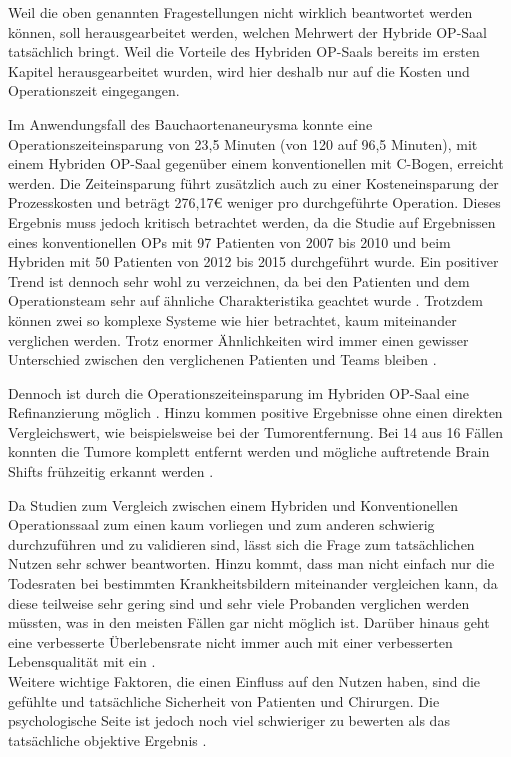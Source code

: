 Weil die oben genannten Fragestellungen nicht wirklich beantwortet werden können, soll herausgearbeitet werden, welchen Mehrwert der Hybride OP-Saal tatsächlich bringt. Weil die Vorteile des Hybriden OP-Saals bereits im ersten Kapitel herausgearbeitet wurden, wird hier deshalb nur auf die Kosten und Operationszeit eingegangen.

Im Anwendungsfall des Bauchaortenaneurysma konnte eine Operationszeiteinsparung von 23,5 Minuten (von 120 auf 96,5 Minuten), mit einem Hybriden OP-Saal gegenüber einem konventionellen mit C-Bogen, erreicht werden. Die Zeiteinsparung führt zusätzlich auch zu einer Kosteneinsparung der Prozesskosten und beträgt 276,17€ weniger pro durchgeführte Operation.
Dieses Ergebnis muss jedoch kritisch betrachtet werden, da die Studie auf Ergebnissen eines konventionellen OPs mit 97 Patienten von 2007 bis 2010 und beim Hybriden mit 50 Patienten von 2012 bis 2015 durchgeführt wurde. Ein positiver Trend ist dennoch sehr wohl zu verzeichnen, da bei den Patienten und dem Operationsteam sehr auf  ähnliche Charakteristika geachtet wurde \cite{HybriderVsKonventioneller}.
Trotzdem können zwei so komplexe Systeme wie hier betrachtet, kaum miteinander verglichen werden. Trotz enormer Ähnlichkeiten wird immer einen gewisser Unterschied zwischen den verglichenen Patienten und Teams bleiben \cite{DerDigitaleOperationssaal}.

Dennoch ist durch die Operationszeiteinsparung im Hybriden OP-Saal eine Refinanzierung möglich \cite{HybriderVsKonventioneller}. Hinzu kommen positive Ergebnisse ohne einen direkten Vergleichswert, wie beispielsweise bei der Tumorentfernung. Bei 14 aus 16 Fällen konnten die Tumore komplett entfernt werden und mögliche auftretende Brain Shifts frühzeitig erkannt werden \cite{BrainShiftInTumorResection}.

Da Studien zum Vergleich zwischen einem Hybriden und Konventionellen Operationssaal zum einen kaum vorliegen und zum anderen schwierig durchzuführen und zu validieren sind, lässt sich die Frage zum tatsächlichen Nutzen sehr schwer beantworten. Hinzu kommt, dass man nicht einfach nur die Todesraten bei bestimmten Krankheitsbildern miteinander vergleichen kann, da diese teilweise sehr gering sind und sehr viele Probanden verglichen werden müssten, was in den meisten Fällen gar nicht möglich ist. Darüber hinaus geht eine verbesserte Überlebensrate nicht immer auch mit einer verbesserten Lebensqualität mit ein \cite{HybriderVsKonventioneller}. \\
Weitere wichtige Faktoren, die einen Einfluss auf den Nutzen haben, sind die gefühlte und tatsächliche Sicherheit von Patienten und Chirurgen. Die psychologische Seite ist jedoch noch viel schwieriger zu bewerten als das tatsächliche objektive Ergebnis \cite{DerDigitaleOperationssaal}.

